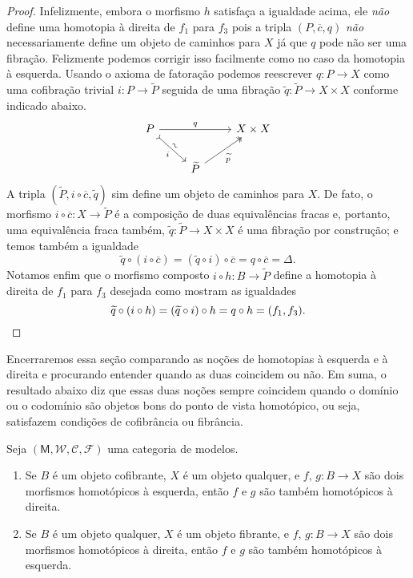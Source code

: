 \begin{proof}
  Infelizmente, embora o morfismo $h$ satisfaça a igualdade acima, ele \emph{não} define uma homotopia à direita de $f_{1}$ para $f_{3}$ pois a tripla $(P,\overline{c},q)$ \emph{não} necessariamente define um objeto de caminhos para $X$ já que $q$ pode não ser uma fibração.
  Felizmente podemos corrigir isso facilmente como no caso da homotopia à esquerda.
  Usando o axioma de fatoração podemos reescrever $q: P \to X$ como uma cofibração trivial $i: P \to \widetilde{P}$ seguida de uma fibração $\widetilde{q}: \widetilde{P} \to X \times X$ conforme indicado abaixo.
  \begin{displaymath}
    \begin{tikzcd}
      P
      \arrow[rr, "q"]
      \arrow[rd, tail, "i" {swap}, "\sim" {sloped}]
      & & X \times X
      \\ & \widetilde{P}
      \arrow[ru, two heads, "\widetilde{p}" swap]
    \end{tikzcd}
  \end{displaymath}
  A tripla $(\widetilde{P},i \circ \overline{c},\widetilde{q})$ sim define um objeto de caminhos para $X$.
  De fato, o morfismo $i \circ \overline{c}: X \to \widetilde{P}$ é a composição de duas equivalências fracas e, portanto, uma equivalência fraca também, $\widetilde{q}: \widetilde{P} \to X \times X$ é uma fibração por construção; e temos também a igualdade
  \begin{displaymath}
    \widetilde{q} \circ (i \circ \overline{c}) = (\widetilde{q} \circ i) \circ \overline{c} = q \circ \overline{c} = \Delta.
  \end{displaymath}
  Notamos enfim que o morfismo composto $i \circ h: B \to \widetilde{P}$ define a homotopia à direita de $f_{1}$ para $f_{3}$ desejada como mostram as igualdades
  \begin{displaymath}
    \widetilde{q} \circ (i \circ h) = (\widetilde{q} \circ i) \circ h = q \circ h = (f_{1},f_{3}). \qedhere
  \end{displaymath}
\end{proof}

Encerraremos essa seção comparando as noções de homotopias à esquerda e à direita e procurando entender quando as duas coincidem ou não.
Em suma, o resultado abaixo diz que essas duas noções sempre coincidem quando o domínio ou o codomínio são objetos bons do ponto de vista homotópico, ou seja, satisfazem condições de cofibrância ou fibrância.

\begin{prop}\label{prop:comparando_homotopia_esquerda_direita}
  Seja $(\mathsf{M},\mathcal{W},\mathcal{C},\mathcal{F})$ uma categoria de modelos.
  \begin{enumerate}
  \item Se $B$ é um objeto cofibrante, $X$ é um objeto qualquer, e $f,\,g: B \to X$ são dois morfismos homotópicos à esquerda, então $f$ e $g$ são também homotópicos à direita.
    
  \item Se $B$ é um objeto qualquer, $X$ é um objeto fibrante, e $f,\,g: B \to X$ são dois morfismos homotópicos à direita, então $f$ e $g$ são também homotópicos à esquerda.
  \end{enumerate}
\end{prop}


